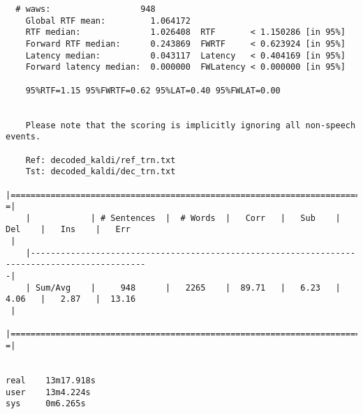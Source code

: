 \begin{verbatim}
  # waws:                  948
    Global RTF mean:         1.064172
    RTF median:              1.026408  RTF       < 1.150286 [in 95%]
    Forward RTF median:      0.243869  FWRTF     < 0.623924 [in 95%]
    Latency median:          0.043117  Latency   < 0.404169 [in 95%]
    Forward latency median:  0.000000  FWLatency < 0.000000 [in 95%]
    
    95%RTF=1.15 95%FWRTF=0.62 95%LAT=0.40 95%FWLAT=0.00


    Please note that the scoring is implicitly ignoring all non-speech events.
    
    Ref: decoded_kaldi/ref_trn.txt
    Tst: decoded_kaldi/dec_trn.txt
    |=============================================================================================
=|
    |            | # Sentences  |  # Words  |   Corr   |   Sub    |   Del    |   Ins    |   Err   
 |
    |---------------------------------------------------------------------------------------------
-|
    | Sum/Avg    |     948      |   2265    |  89.71   |   6.23   |   4.06   |   2.87   |  13.16  
 |
    |=============================================================================================
=|
    

real    13m17.918s
user    13m4.224s
sys     0m6.265s
\end{verbatim}



